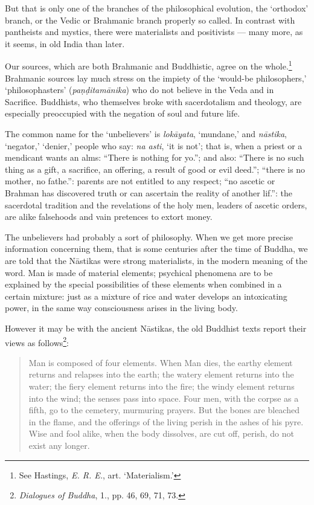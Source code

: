 \documentclass[a4paper, 11pt, oneside, english]{article}
\begin{document}
But that is only one of the branches of the philosophical evolution, the `orthodox' branch, or the Vedic or Brahmanic branch properly so called. In contrast with pantheists and mystics, there were materialists and positivists --- many more, as it seems, in old India than later.

Our sources, which are both Brahmanic and Buddhistic, agree on the whole.\footnote{See Hastings, \emph{E. R. E.}, art. `Materialism.'} Brahmanic sources lay much stress on the impiety of the `would-be philosophers,' `philosophasters' (\emph{paṇḍitamānika}) who do not believe in the Veda and in Sacrifice. Buddhists, who themselves broke with sacerdotalism and theology, are especially preoccupied with the negation of soul and future life.

The common name for the `unbelievers' is \emph{lokāyata}, `mundane,' and \emph{nāstika}, `negator,' `denier,' people who say: \emph{na asti}, `it is not'; that is, when a priest or a mendicant wants an alms: ``There is nothing for yo.''; and also: ``There is no such thing as a gift, a sacrifice, an offering, a result of good or evil deed.''; ``there is no mother, no fathe.'': parents are not entitled to any respect; ``no ascetic or Brahman has discovered truth or can ascertain the reality of another lif.'': the sacerdotal tradition and the revelations of the holy men, leaders of ascetic orders, are alike falsehoods and vain pretences to extort money.

The unbelievers had probably a sort of philosophy. When we get more precise information concerning them, that is some centuries after the time of Buddha, we are told that the Nāstikas were strong materialists, in the modern meaning of the word. Man is made of material elements; psychical phenomena are to be explained by the special possibilities of these elements when combined in a certain mixture: just as a mixture of rice and water develops an intoxicating power, in the same way consciousness arises in the living body.

However it may be with the ancient Nāstikas, the old Buddhist texts report their views as follows\footnote{\emph{Dialogues of Buddha}, 1., pp. 46, 69, 71, 73.}:
\begin{quotation}
\small
Man is composed of four elements. When Man dies, the earthy element returns and relapses into the earth; the watery element returns into the water; the fiery element returns into the fire; the windy element returns into the wind; the senses pass into space. Four men, with the corpse as a fifth, go to the cemetery, murmuring prayers. But the bones are bleached in the flame, and the offerings of the living perish in the ashes of his pyre. Wise and fool alike, when the body dissolves, are cut off, perish, do not exist any longer.
\end{quotation}
\end{document}
